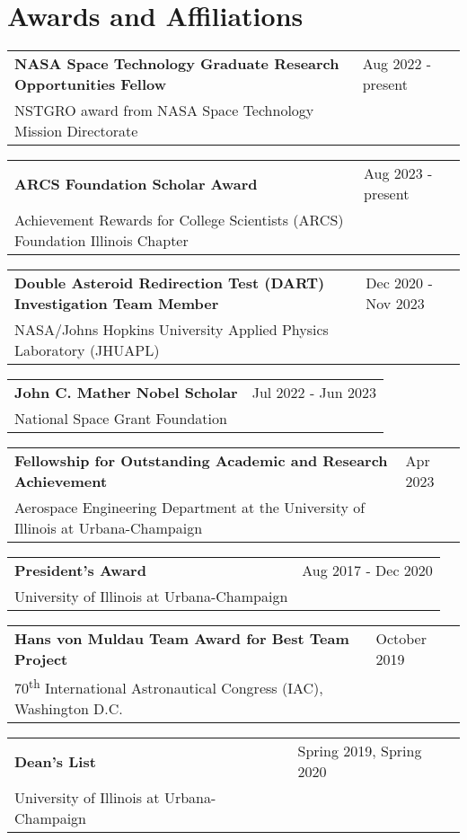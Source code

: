\documentclass[letterpaper,12pt]{article}
\begin{document}
\section{Awards and Affiliations}
\begin{tabularx}{\linewidth}{@{}l X@{}}
\textbf{NASA Space Technology Graduate Research Opportunities Fellow} & \hfill Aug 2022 - present \\[3.75pt]
NSTGRO award from NASA Space Technology Mission Directorate & \hfill \\[3.75pt]
\end{tabularx}
\begin{tabularx}{\linewidth}{@{}l X@{}}
\textbf{ARCS Foundation Scholar Award} & \hfill Aug 2023 - present \\[3.75pt]
Achievement Rewards for College Scientists (ARCS) Foundation Illinois Chapter & \hfill \\[3.75pt]
\end{tabularx}
\begin{tabularx}{\linewidth}{@{}l X@{}}
\textbf{Double Asteroid Redirection Test (DART) Investigation Team Member} & \hfill Dec 2020 - Nov 2023 \\[3.75pt]
NASA/Johns Hopkins University Applied Physics Laboratory (JHUAPL) & \hfill \\[3.75pt]
\end{tabularx}
\begin{tabularx}{\linewidth}{@{}l X@{}}
\textbf{John C. Mather Nobel Scholar} & \hfill Jul 2022 - Jun 2023 \\[3.75pt]
National Space Grant Foundation & \hfill \\[3.75pt]
\end{tabularx}
\begin{tabularx}{\linewidth}{@{}l X@{}}
\textbf{Fellowship for Outstanding Academic and Research Achievement} & \hfill Apr 2023 \\[3.75pt]
Aerospace Engineering Department at the University of Illinois at Urbana-Champaign & \hfill \\[3.75pt]
\end{tabularx}
\begin{tabularx}{\linewidth}{@{}l X@{}}
\textbf{President's Award} & \hfill Aug 2017 - Dec 2020 \\[3.75pt]
University of Illinois at Urbana-Champaign & \hfill \\[3.75pt]
\end{tabularx}
\begin{tabularx}{\linewidth}{@{}l X@{}}
\textbf{Hans von Muldau Team Award for Best Team Project} & \hfill October 2019 \\[3.75pt]
70\textsuperscript{th} International Astronautical Congress (IAC), Washington D.C. & \hfill \\[3.75pt]
\end{tabularx}
\begin{tabularx}{\linewidth}{@{}l X@{}}
\textbf{Dean's List} & \hfill Spring 2019, Spring 2020 \\[3.75pt]
University of Illinois at Urbana-Champaign & \hfill \\[3.75pt]
\end{tabularx}
\end{document}
